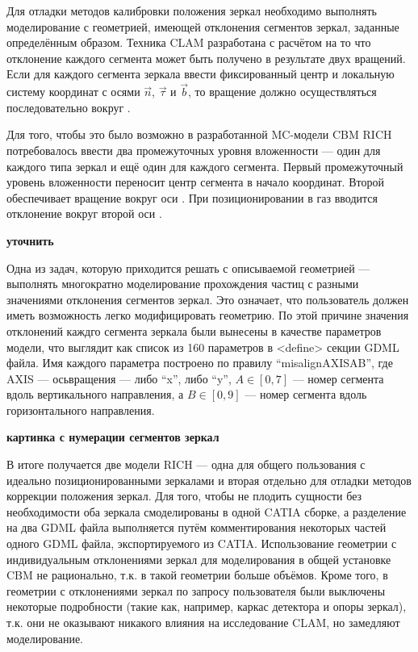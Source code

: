 Для отладки методов калибровки положения зеркал необходимо выполнять моделирование с геометрией, имеющей отклонения сегментов зеркал, заданные определённым образом. Техника \todo CLAM разработана с расчётом на то что отклонение каждого сегмента может быть получено в результате двух вращений. Если для каждого сегмента зеркала ввести фиксированный центр и локальную систему координат с осями $\overrightarrow{n}$, $\overrightarrow{\tau}$ и $\overrightarrow{b}$, то вращение должно осуществляться последовательно вокруг \todo.

Для того, чтобы это было возможно в разработанной MC-модели CBM RICH потребовалось ввести два промежуточных уровня вложенности --- один для каждого типа зеркал и ещё один для каждого сегмента. Первый промежуточный уровень вложенности переносит центр сегмента в начало координат. Второй обеспечивает вращение вокруг оси \todo. При позиционировании в газ вводится отклонение вокруг второй оси \todo.

\todo \textbf{уточнить}

Одна из задач, которую приходится решать с описываемой геометрией --- выполнять многократно моделирование прохождения частиц с разными значениями отклонения сегментов зеркал. Это означает, что пользователь должен иметь возможность легко модифицировать геометрию. По этой причине значения отклонений каждго сегмента зеркала были вынесены в качестве параметров модели, что выглядит как список из 160 параметров в <define> секции GDML файла. Имя каждого параметра построено по правилу ``misalign\textunderscore AXIS\textunderscore A\textunderscore B'', где AXIS --- осьвращения --- либо ``x'', либо ``y'', $A \in [0,7]$ --- номер сегмента вдоль вертикального направления, а $B \in [0,9]$ --- номер сегмента вдоль горизонтального направления.

\todo \textbf{картинка с нумерации сегментов зеркал}

В итоге получается две модели RICH --- одна для общего пользования с идеально позиционированными зеркалами и вторая отдельно для отладки методов коррекции положения зеркал. Для того, чтобы не \todo плодить сущности без необходимости оба зеркала смоделированы в одной CATIA сборке, а разделение на два GDML файла выполняется путём комментирования некоторых частей одного GDML файла, экспортируемого из CATIA. Использование геометрии с индивидуальным отклонениями зеркал для моделирования в общей установке CBM не рационально, т.к. в такой геометрии больше объёмов. Кроме того, в геометрии с отклонениями зеркал по запросу пользователя были выключены некоторые подробности (такие как, например, каркас детектора и опоры зеркал), т.к. они не оказывают никакого влияния на исследование CLAM, но замедляют моделирование.

